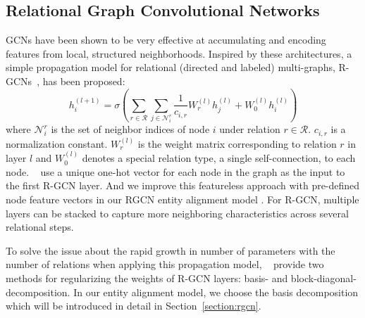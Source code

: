 	\subsection*{Relational Graph Convolutional Networks}
	\label{section:Relational Graph Convolutional Networks}
	GCNs have been shown to be very effective at accumulating and encoding features from local, structured neighborhoods. Inspired by these architectures, a simple propagation model for relational (directed and labeled) multi-graphs, R-GCNs~\cite{Schlichtkrull2017Modeling}, has been proposed:
	\begin{equation}
	h_i^{(l+1)}=\sigma (\sum_{r \in \mathcal{R}}\sum_{j \in \mathcal{N}_i^r}\frac{1}{c_{i,r}}W_r^{(l)}h_j^{(l)}+W_0^{(l)}h_i^{(l)})
	\end{equation}
	where $\mathcal{N}_i^r$ is the set of neighbor indices of node $i$ under relation $r \in \mathcal{R}$. $c_{i,r}$ is a normalization constant. $W_r^{(l)}$ is the weight matrix corresponding to relation $r$ in layer $l$ and $W_0^{(l)}$ denotes a special relation type, a single self-connection, to each node. ~\cite{Schlichtkrull2017Modeling} use a unique one-hot vector for each node in the graph as the input to the first R-GCN layer. And we improve this featureless approach with pre-defined node feature vectors in our RGCN entity alignment model .
	For R-GCN, multiple layers can be stacked to capture more neighboring characteristics across several relational steps.
	
	To solve the issue about the rapid growth in number of parameters with the number of relations when applying this propagation model, ~\cite{Schlichtkrull2017Modeling} provide two methods for regularizing the weights of R-GCN layers: basis- and block-diagonal-decomposition. In our entity alignment model, we choose the basis decomposition which will be introduced in detail in Section~\ref{section:rgcn}.
